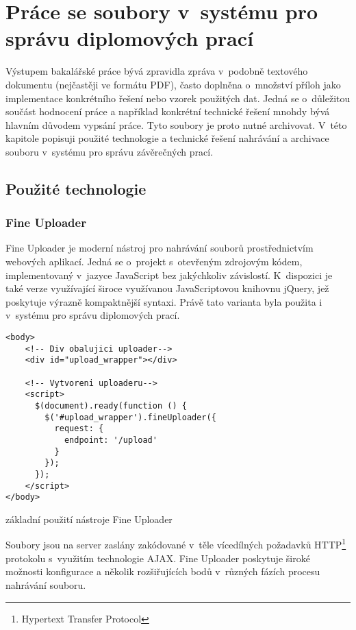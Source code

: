 \chapter{Práce se soubory v~systému pro správu diplomových prací}
Výstupem bakalářské práce bývá zpravidla zpráva v~podobně textového dokumentu (nejčastěji ve formátu PDF), často doplněna o~množství příloh jako implementace konkrétního řešení nebo vzorek použitých dat. Jedná se o~důležitou součást hodnocení práce a například konkrétní technické řešení mnohdy bývá hlavním důvodem vypsání práce. Tyto soubory je proto nutné archivovat. V~této kapitole popisuji použité technologie a technické řešení nahrávání a archivace souboru v~systému pro správu závěrečných prací.

\section{Použité technologie}
\subsection{Fine Uploader}
Fine Uploader je moderní nástroj pro nahrávání souborů prostřednictvím webových aplikací. Jedná se o~projekt s~otevřeným zdrojovým kódem, implementovaný v~jazyce JavaScript bez jakýchkoliv závislostí\cite{fu-homepage}. K~dispozici je také verze využívající široce využívanou JavaScriptovou knihovnu jQuery, jež poskytuje výrazně kompaktnější syntaxi. Právě tato varianta byla použita i v~systému pro správu diplomových prací.
\begin{example}
    \centering
    \begin{lstlisting}
<body>
    <!-- Div obalujici uploader-->
    <div id="upload_wrapper"></div>

    <!-- Vytvoreni uploaderu-->
    <script>
      $(document).ready(function () {
        $('#upload_wrapper').fineUploader({
          request: {
            endpoint: '/upload'
          }
        });
      });
    </script>
</body>
    \end{lstlisting}
    \caption{základní použití nástroje  Fine Uploader}
\end{example}
Soubory jsou na server zaslány zakódované v~těle vícedílných požadavků HTTP\footnote{Hypertext Transfer Protocol} protokolu s~využitím technologie AJAX. Fine Uploader poskytuje široké možnosti konfigurace a několik rozšiřujících bodů v~různých fázích procesu nahrávání souboru.


